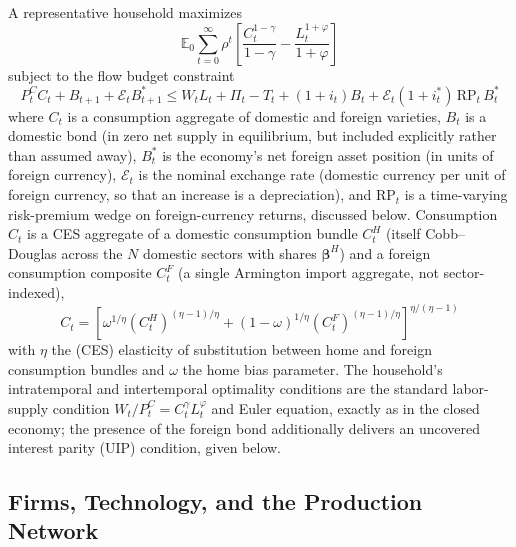 \documentclass[12pt]{article}
\begin{document}
A representative household maximizes
\begin{equation}
    \mathbb E_0\sum_{t=0}^\infty\rho^t\left[\frac{C_t^{1-\gamma}}{1-\gamma}-\frac{L_t^{1+\varphi}}{1+\varphi}\right]
\end{equation}
subject to the flow budget constraint
\begin{equation}
    P_t^C C_t + B_{t+1} + \mathcal E_t B_{t+1}^* \le W_tL_t + \Pi_t - T_t + (1+i_t)B_t
    + \mathcal E_t(1+i_t^*)\,\mathrm{RP}_t\,B_t^*
\end{equation}
where $C_t$ is a consumption aggregate of domestic and foreign varieties, $B_t$ is a domestic bond
(in zero net supply in equilibrium, but included explicitly rather than assumed away),
$B_t^*$ is the economy's net foreign asset position (in units of foreign currency), $\mathcal E_t$ is
the nominal exchange rate (domestic currency per unit of foreign currency, so that an increase is a
depreciation), and $\mathrm{RP}_t$ is a time-varying risk-premium wedge on foreign-currency returns,
discussed below. Consumption $C_t$ is a CES aggregate of a domestic consumption bundle $C_t^H$ (itself
Cobb--Douglas across the $N$ domestic sectors with shares $\bm\beta^H$) and a foreign consumption
composite $C_t^F$ (a single Armington import aggregate, not sector-indexed),
\begin{equation}
    C_t = \left[\omega^{1/\eta}(C_t^H)^{(\eta-1)/\eta} + (1-\omega)^{1/\eta}(C_t^F)^{(\eta-1)/\eta}\right]^{\eta/(\eta-1)}
\end{equation}
with $\eta$ the (CES) elasticity of substitution between home and foreign consumption bundles and
$\omega$ the home bias parameter. The household's intratemporal and intertemporal optimality
conditions are the standard labor-supply condition $W_t/P_t^C = C_t^\gamma L_t^\varphi$ and Euler
equation, exactly as in the closed economy; the presence of the foreign bond additionally delivers an
uncovered interest parity (UIP) condition, given below.

\subsection{Firms, Technology, and the Production Network}
\end{document}
